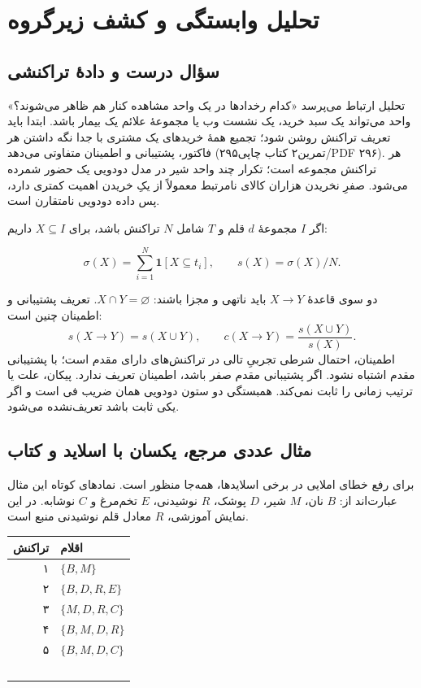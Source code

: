 \chapter{تحلیل وابستگی و کشف زیرگروه}
\section{سؤال درست و دادهٔ تراکنشی}

تحلیل ارتباط می‌پرسد «کدام رخدادها در یک واحد مشاهده کنار هم ظاهر می‌شوند؟» واحد می‌تواند یک سبد خرید، یک نشست وب یا مجموعهٔ علائم یک بیمار باشد. ابتدا باید تعریف تراکنش روشن شود؛ تجمیع همهٔ خریدهای یک مشتری با جدا نگه داشتن هر فاکتور، پشتیبانی و اطمینان متفاوتی می‌دهد (تمرین۲ کتاب چاپی۲۹۵/PDF ۲۹۶). هر تراکنش مجموعه است؛ تکرار چند واحد شیر در مدل دودویی یک حضور شمرده می‌شود. صفرِ نخریدن هزاران کالای نامرتبط معمولاً از یکِ خریدن اهمیت کمتری دارد، پس داده دودویی نامتقارن است.

اگر $I$ مجموعهٔ $d$ قلم و $T$ شامل $N$ تراکنش باشد، برای $X\subseteq I$ داریم:

\[\sigma(X)=\sum_{i=1}^{N}\mathbf1[X\subseteq t_i],\qquad s(X)=\sigma(X)/N.\]

دو سوی قاعدهٔ $X\to Y$ باید ناتهی و مجزا باشند: $X\cap Y=\varnothing$. تعریف پشتیبانی و اطمینان چنین است:
\[s(X\to Y)=s(X\cup Y),\qquad c(X\to Y)=\frac{s(X\cup Y)}{s(X)}.\]
اطمینان، احتمال شرطی تجربیِ تالی در تراکنش‌های دارای مقدم است؛ با پشتیبانی مقدم اشتباه نشود. اگر پشتیبانی مقدم صفر باشد، اطمینان تعریف ندارد. پیکان، علت یا ترتیب زمانی را ثابت نمی‌کند. همبستگی دو ستون دودویی همان ضریب فی است و اگر یکی ثابت باشد تعریف‌نشده می‌شود.

\section{مثال عددی مرجع، یکسان با اسلاید و کتاب}

برای رفع خطای املایی  در برخی اسلایدها، همه‌جا  منظور است. نمادهای کوتاه این مثال عبارت‌اند از: $B$ نان، $M$ شیر، $D$ پوشک، $R$ نوشیدنی، $E$ تخم‌مرغ و $C$ نوشابه. در این نمایش آموزشی، $R$ معادل قلم نوشیدنی منبع است.

{\def\LTcaptype{table} %
\begin{longtable}[]{@{}rl@{}}
\toprule\noalign{}
تراکنش & اقلام \\
\midrule\noalign{}
\endhead
\bottomrule\noalign{}
\endlastfoot
۱ & $\{B,M\}$ \\\
۲ & $\{B,D,R,E\}$ \\\
۳ & $\{M,D,R,C\}$ \\\
۴ & $\{B,M,D,R\}$ \\\
۵ & $\{B,M,D,C\}$ \\\
\end{longtable}
}

